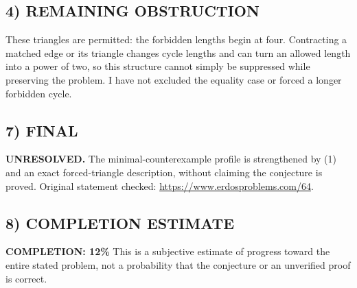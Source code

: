 \subsection*{4) REMAINING OBSTRUCTION}
These triangles are permitted: the forbidden lengths begin at four. Contracting a matched edge or its triangle changes cycle lengths and can turn an allowed length into a power of two, so this structure cannot simply be suppressed while preserving the problem. I have not excluded the equality case or forced a longer forbidden cycle.
\subsection*{7) FINAL}
\textbf{UNRESOLVED.} The minimal-counterexample profile is strengthened by (1) and an exact forced-triangle description, without claiming the conjecture is proved.
\noindent Original statement checked: \url{https://www.erdosproblems.com/64}.

\subsection*{8) COMPLETION ESTIMATE}
\textbf{COMPLETION: 12\%}
This is a subjective estimate of progress toward the entire stated problem, not a probability that the conjecture or an unverified proof is correct.
